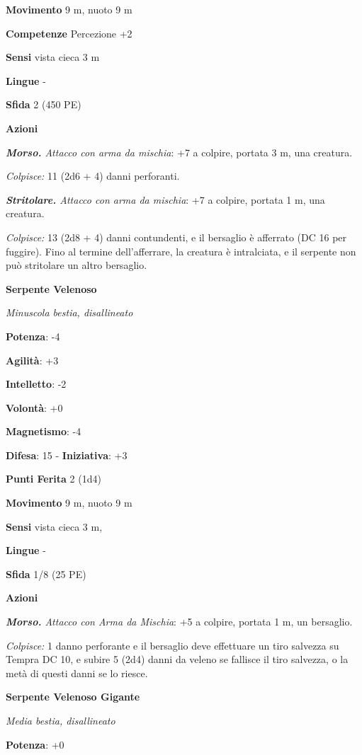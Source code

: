 \begin{multicols}{2}
\textbf{Movimento} 9 m, nuoto 9 m

\textbf{Competenze} Percezione +2

\textbf{Sensi} vista cieca 3 m

\textbf{Lingue} -

\textbf{Sfida} 2 (450 PE)\smallskip

\smallskip\textbf{Azioni}

\emph{\textbf{Morso.} Attacco con arma da mischia}: +7 a colpire,
portata 3 m, una creatura.

\emph{Colpisce:} 11 (2d6 + 4) danni perforanti.

\emph{\textbf{Stritolare.} Attacco con arma da mischia}: +7 a colpire,
portata 1 m, una creatura.

\emph{Colpisce:} 13 (2d8 + 4) danni contundenti, e il bersaglio è
afferrato (DC 16 per fuggire). Fino al termine dell'afferrare, la
creatura è intralciata, e il serpente non può stritolare un altro
bersaglio.



\textbf{Serpente Velenoso}

\emph{Minuscola bestia, disallineato}

\textbf{Potenza}: -4

\textbf{Agilità}: +3

\textbf{Intelletto}: -2

\textbf{Volontà}: +0

\textbf{Magnetismo}: -4

\textbf{Difesa}: 15 - \textbf{Iniziativa}: +3

\textbf{Punti Ferita} 2 (1d4)

\textbf{Movimento} 9 m, nuoto 9 m

\textbf{Sensi} vista cieca 3 m, 

\textbf{Lingue} -

\textbf{Sfida} 1/8 (25 PE)\smallskip

\smallskip\textbf{Azioni}

\emph{\textbf{Morso.} Attacco con Arma da Mischia}: +5 a colpire,
portata 1 m, un bersaglio.

\emph{Colpisce:} 1 danno perforante e il bersaglio deve effettuare un
tiro salvezza su Tempra DC 10, e subire 5 (2d4) danni da veleno se
fallisce il tiro salvezza, o la metà di questi danni se lo riesce.

\textbf{Serpente Velenoso Gigante}

\emph{Media bestia, disallineato}

\textbf{Potenza}: +0


\end{multicols}

